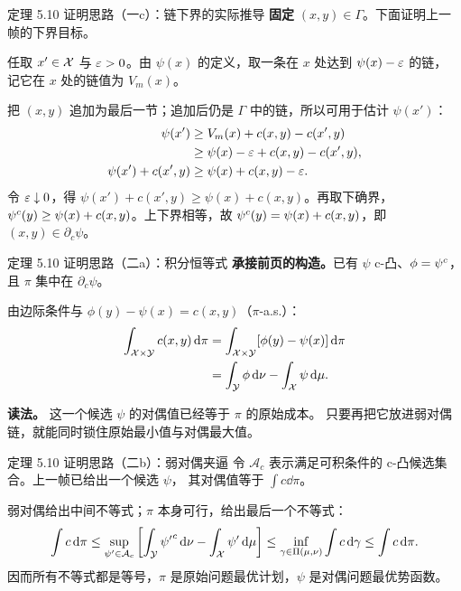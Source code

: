 \begin{frame}{定理 5.10 证明思路（一c）：链下界的实际推导}
  \textbf{固定} $(x,y)\in\Gamma$。\proofskipnote 下面证明上一帧的下界目标。

  任取 $x'\in\mathcal{X}$ 与 $\varepsilon>0$。由 $\psi(x)$ 的定义，取一条在 $x$ 处达到 $\psi(x)-\varepsilon$ 的链，
  记它在 $x$ 处的链值为 $V_m(x)$。

  把 $(x,y)$ 追加为最后一节；追加后仍是 $\Gamma$ 中的链，所以可用于估计 $\psi(x')$：
  \[
    \begin{aligned}
      \psi(x')
      &\ge V_m(x)+c(x,y)-c(x',y)\\
      &\ge \psi(x)-\varepsilon+c(x,y)-c(x',y),\\
      \psi(x')+c(x',y)
      &\ge \psi(x)+c(x,y)-\varepsilon .
    \end{aligned}
  \]
  令 $\varepsilon\downarrow0$，得 $\psi(x')+c(x',y)\ge\psi(x)+c(x,y)$。再取下确界，
  ${\psi}^{c}(y)\ge\psi(x)+c(x,y)$。上下界相等，故
  ${\psi}^{c}(y)=\psi(x)+c(x,y)$，即 $(x,y)\in\partial_c\psi$。

\end{frame}

\begin{frame}{定理 5.10 证明思路（二a）：积分恒等式}
  \textbf{承接前页的构造。}\proofskipnote 已有 $\psi$ c-凸、$\phi={\psi}^{c}$，且 $\pi$ 集中在 $\partial_c\psi$。

   由边际条件与 $\phi(y)-\psi(x)=c(x,y)$（$\pi$-a.s.）：
  \[
    \begin{aligned}
      \int_{\mathcal{X}\times\mathcal{Y}} c(x,y)\,\mathrm{d}\pi
      &= \int_{\mathcal{X}\times\mathcal{Y}}[\phi(y)-\psi(x)]\,\mathrm{d}\pi\\
      &= \int_{\mathcal{Y}}\phi\,\mathrm{d}\nu - \int_{\mathcal{X}}\psi\,\mathrm{d}\mu .
    \end{aligned}
  \]

  \textbf{读法。} 这一个候选 $\psi$ 的对偶值已经等于 $\pi$ 的原始成本。
  只要再把它放进弱对偶链，就能同时锁住原始最小值与对偶最大值。

\end{frame}

\begin{frame}{定理 5.10 证明思路（二b）：弱对偶夹逼}
  令 $\mathcal A_c$ 表示满足可积条件的 c-凸候选集合。\proofskipnote 上一帧已给出一个候选 $\psi$，
  其对偶值等于 $\int c\dd\pi$。

   弱对偶给出中间不等式；$\pi$ 本身可行，给出最后一个不等式：
  \[
    \int c\,\mathrm{d}\pi
    \le \sup_{\psi'\in\mathcal A_c}\left[\int_{\mathcal{Y}}{\psi'}^{c}\,\mathrm{d}\nu-\int_{\mathcal{X}}\psi'\,\mathrm{d}\mu\right]
    \le \inf_{\gamma\in\Pi(\mu,\nu)}\int c\,\mathrm{d}\gamma
    \le \int c\,\mathrm{d}\pi .
  \]
  因而所有不等式都是等号，$\pi$ 是原始问题最优计划，$\psi$ 是对偶问题最优势函数。

\end{frame}

